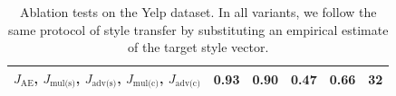 \documentclass[letterpaper]{article} %
\newcommand{\loss}[1]{J_{\text{#1}}}
\begin{document}
\begin{table}[ht]
\begin{tabular}{| l || c | c | c | c | c |}
		$\loss{AE}$, $\loss{mul(s)}$, $\loss{adv(s)}$, $\loss{mul(c)}$, $\loss{adv(c)}$ & \textbf{0.93}                 & 0.90                         & \textbf{0.47}                & \textbf{0.66}     & 32                            \\ \hline
	\end{tabular}\vspace{-.2cm}
	\caption{Ablation tests on the Yelp dataset. In all variants, we follow the same protocol of style transfer by substituting an empirical estimate of the target style vector.}
	\label{tab:ablation-results}
\end{table}
\end{document}
